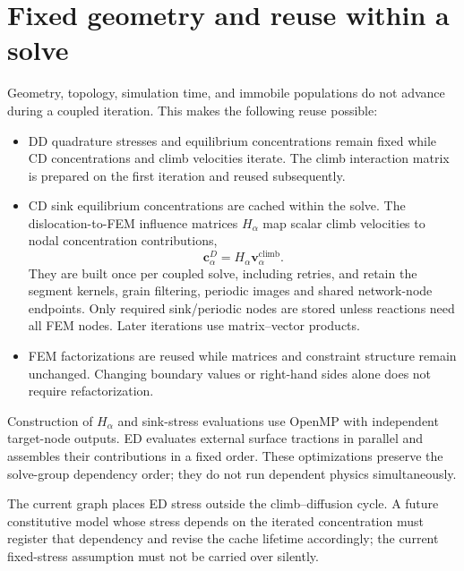 \section{Fixed geometry and reuse within a solve}
Geometry, topology, simulation time, and immobile populations do not advance during a coupled iteration. This makes the following reuse possible:
\begin{itemize}
\item DD quadrature stresses and equilibrium concentrations remain fixed while CD concentrations and climb velocities iterate. The climb interaction matrix is prepared on the first iteration and reused subsequently.
\item CD sink equilibrium concentrations are cached within the solve. The dislocation-to-FEM influence matrices $H_\alpha$ map scalar climb velocities to nodal concentration contributions,
\begin{equation}
 \bm c^{D}_\alpha=H_\alpha\bm v^{\mathrm{climb}}_\alpha.
\end{equation}
They are built once per coupled solve, including retries, and retain the segment kernels, grain filtering, periodic images and shared network-node endpoints. Only required sink/periodic nodes are stored unless reactions need all FEM nodes. Later iterations use matrix--vector products.
\item FEM factorizations are reused while matrices and constraint structure remain unchanged. Changing boundary values or right-hand sides alone does not require refactorization.
\end{itemize}
Construction of $H_\alpha$ and sink-stress evaluations use OpenMP with independent target-node outputs. ED evaluates external surface tractions in parallel and assembles their contributions in a fixed order. These optimizations preserve the solve-group dependency order; they do not run dependent physics simultaneously.

The current graph places ED stress outside the climb--diffusion cycle. A future constitutive model whose stress depends on the iterated concentration must register that dependency and revise the cache lifetime accordingly; the current fixed-stress assumption must not be carried over silently.

